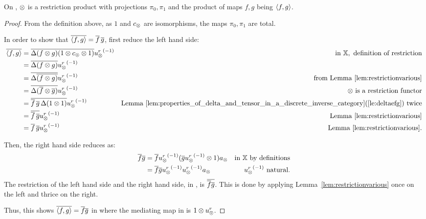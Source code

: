\begin{lemma}\label{lem:tensor_on_x_is_the_restriction_product_on_xt}
  On \Xt, $\otimes$ is a restriction product with projections $\pi_0, \pi_1$ and the product of maps
  $f, g$ being $\langle f,g\rangle$.
\end{lemma}
\begin{proof}
  From the definition above, as $1$ and $c_{\otimes}$ are isomorphisms, the maps $\pi_0, \pi_1$ are
  total.

  In order to show that $\overline{\langle f,g\rangle} = \overline{f}\,\overline{g}$, first reduce the left hand side:
  \begin{align*}
    \overline{\langle f,g\rangle}
      &=\overline{\Delta(f\otimes g)(1\otimes c_{\otimes}\otimes1)}{u_{\otimes}^r}^{(-1)}&\text{in }\mathbb{X}, \text{ definition of restriction}\\
    &=\overline{\Delta(f\otimes g)}{u_{\otimes}^r}^{(-1)} &\\
    &=\overline{\Delta\overline{(f\otimes g)}}{u_{\otimes}^r}^{(-1)} &\text{from Lemma \ref{lem:restrictionvarious}}\\
    &=\overline{\Delta(\overline{f}\otimes\overline{g})}{u_{\otimes}^r}^{(-1)} &\otimes\text{ is a restriction functor}\\
    &=\overline{\overline{f}\,\overline{g}\,\Delta(1\otimes1)}{u_{\otimes}^r}^{(-1)}
      &\text{Lemma  \ref{lem:properties_of_delta_and_tensor_in_a_discrete_inverse_category}(\ref{le:deltaefg}) twice}\\
    &=\overline{\overline{f}\,\overline{g}}{u_{\otimes}^r}^{(-1)} &\text{Lemma  \ref{lem:restrictionvarious}}\\
    &=\overline{f}\,\overline{g}{u_{\otimes}^r}^{(-1)}  &\text{Lemma  \ref{lem:restrictionvarious}.}\\
  \end{align*}

  Then, the right hand side reduces as:
  \begin{align*}
    \rst{f} \rst{g}
    &= \rst{f}\inv{\usr}(\rst{g}\inv{\usr} \* 1) a_{\*} & \text{in \X by definitions}\\
    &= \rst{f} \rst{g}\inv{\usr}\inv{\usr} a_{\*} &  \inv{\usr}\text{ natural.}
  \end{align*}
  The restriction of the left hand side and the right hand side, in \X, is $\overline{\overline{f} \overline{g}}$.
  This is done by applying Lemma~\ref{lem:restrictionvarious} once on the left and
  thrice on the right.

  Thus, this shows $\overline{\langle f,g\rangle}=\overline{f} \overline{g}$ in \Xt where the mediating map in \X is
  $1\otimes u_{\otimes}^r$.


\end{proof}
